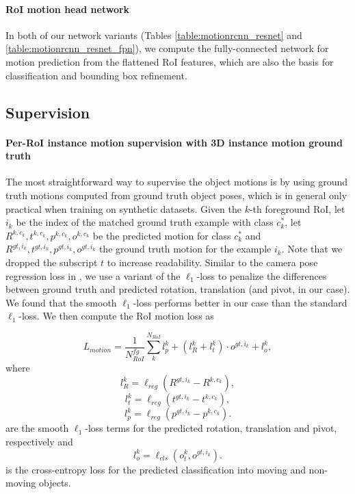 \paragraph{RoI motion head network}
In both of our network variants
(Tables \ref{table:motionrcnn_resnet} and \ref{table:motionrcnn_resnet_fpn}),
we compute the fully-connected network for motion prediction from the
flattened RoI features, which are also the basis for classification and
bounding box refinement.

\subsection{Supervision}
\label{ssec:supervision}

\paragraph{Per-RoI instance motion supervision with 3D instance motion ground truth}
The most straightforward way to supervise the object motions is by using ground truth
motions computed from ground truth object poses, which is in general
only practical when training on synthetic datasets.
Given the $k$-th foreground RoI, let $i_k$ be the index of the matched ground truth example with class $c_k^*$,
let $R^{k,c_k}, t^{k,c_k}, p^{k,c_k}, o^{k,c_k}$ be the predicted motion for class $c_k^*$
and $R^{gt,i_k}, t^{gt,i_k}, p^{gt,i_k}, o^{gt,i_k}$ the ground truth motion for the example $i_k$.
Note that we dropped the subscript $t$ to increase readability.
Similar to the camera pose regression loss in \cite{PoseNet2},
we use a variant of the $\ell_1$-loss to penalize the differences between ground truth and predicted
rotation, translation (and pivot, in our case). We found that the smooth $\ell_1$-loss
performs better in our case than the standard $\ell_1$-loss.
We then compute the RoI motion loss as

\begin{equation}
L_{motion} = \frac{1}{N_{RoI}^{fg}} \sum_k^{N_{RoI}} l_{p}^k + (l_{R}^k + l_{t}^k) \cdot o^{gt,i_k} + l_o^k,
\end{equation}
where
\begin{equation}
l_{R}^k = \ell_{reg} (R^{gt,i_k} - R^{k,c_k}),
\end{equation}
\begin{equation}
l_{t}^k = \ell_{reg} (t^{gt,i_k} - t^{k,c_k}),
\end{equation}
\begin{equation}
l_{p}^k = \ell_{reg} (p^{gt,i_k} - p^{k,c_k}).
\end{equation}
are the smooth $\ell_1$-loss terms for the predicted rotation, translation and pivot,
respectively and
\begin{equation}
l_o^k = \ell_{cls}(o_t^k, o^{gt,i_k}).
\end{equation}
is the cross-entropy loss for the predicted classification into moving and non-moving objects.

